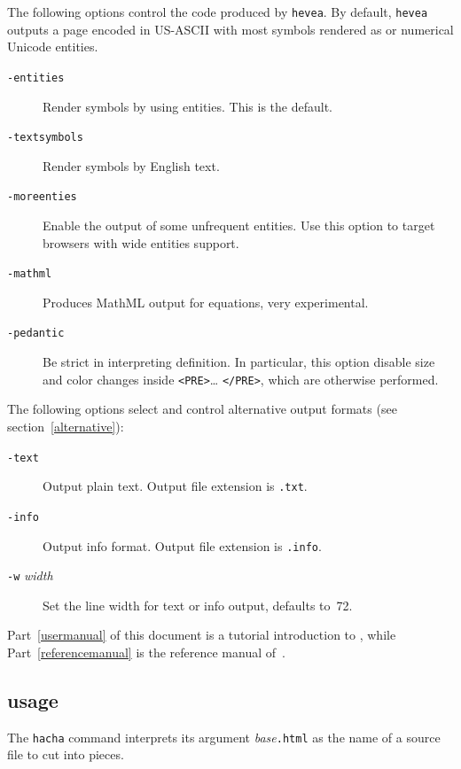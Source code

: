 The following options control the {\html} code produced by
\texttt{hevea}. By default, \texttt{hevea} outputs a page encoded in
US-ASCII with most symbols rendered as {\html} or numerical Unicode
entities.
\begin{description}
\item[{\tt -entities}] Render symbols by using entities. This is the default.
\item[{\tt -textsymbols}] Render symbols by English text.
\item[{\tt -moreenties}] Enable the output of some unfrequent entities. Use
this option to target browsers with wide entities support.
\item[{\tt -mathml}] Produces MathML output for equations, very
experimental.
\item[{\tt -pedantic}]  Be strict in interpreting \html{}
definition. In particular, this option disable size and color changes inside
\verb+<PRE>+\ldots{} \verb+</PRE>+, which are otherwise performed.
\end{description}

The following options select and control alternative output formats
(see section~\ref{alternative}):
\begin{description}
\item[{\tt -text}] Output plain text. Output file
extension is \texttt{.txt}.
\item[{\tt -info}] Output info format. Output file extension
is \texttt{.info}.
\item[{\tt -w} {\it width}] Set the line width for text or info
output, defaults to~72.
\end{description}

Part~\ref{usermanual} of this document is
a tutorial introduction to \hevea{},
while Part~\ref{referencemanual} is the reference manual of~\hevea.


\subsection{\hacha{} usage}
The \texttt{hacha} command interprets its argument
\textit{base}\texttt{.html} as the name of
a \html{} source file to cut into pieces.

